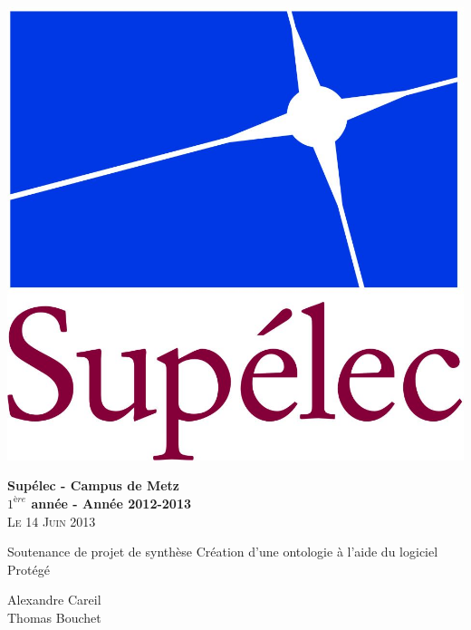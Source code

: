 \begin{minipage}{1\textwidth}
  \centering 

  \begin{flushleft}
    \includegraphics[scale=0.3]{LogoSup.jpg}
    \newline

    \textbf{Supélec - Campus de Metz\\
      $1^{ère}$ année - Année 2012-2013}\\
    \textsc{Le 14 Juin 2013}
  \end{flushleft}
  
  \vskip 5cm
  {\LARGE\textsc Soutenance de projet de synthèse}
  \vskip 0.5cm
  {\LARGE\textsc Création d'une ontologie à l'aide du logiciel Protégé}
  \vskip 5cm

  \Large{Alexandre Careil \\
    Thomas Bouchet}
\end{minipage}
